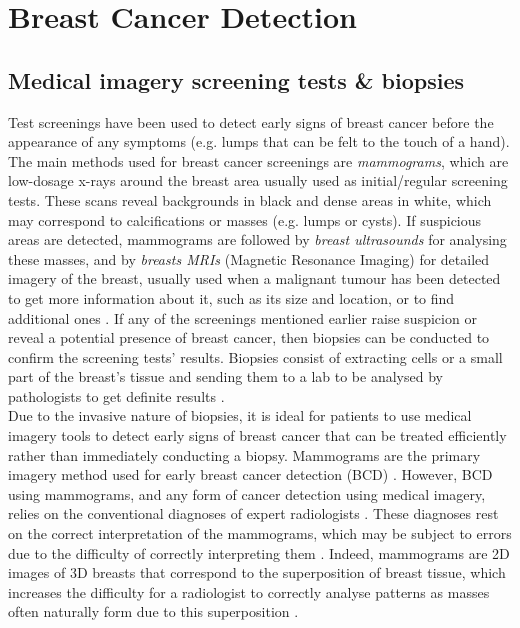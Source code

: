 
\section{Breast Cancer Detection}

\subsection{Medical imagery screening tests \& biopsies}
\label{sec:litreview-bcd-medical-imagery}

Test screenings have been used to detect early signs of breast cancer before the appearance of any symptoms (e.g. lumps that can be felt to the touch of a hand). The main methods used for breast cancer screenings are \textit{mammograms}, which are low-dosage x-rays around the breast area usually  used as initial/regular screening tests. These scans reveal backgrounds in black and dense areas in white, which may correspond to calcifications or masses (e.g. lumps or cysts). If suspicious areas are detected, mammograms are  followed by \textit{breast ultrasounds} for analysing these masses, and by \textit{breasts MRIs} (Magnetic Resonance Imaging) for detailed imagery of the breast, usually used when a malignant tumour has been detected to get more information about it, such as its size and location, or to find additional ones \citep{americanCancerSociety2019}. If any of the screenings mentioned earlier raise suspicion or reveal a potential presence of breast cancer, then biopsies can be conducted to confirm the screening tests' results. Biopsies consist of extracting cells or a small part of the breast's tissue and sending them to a lab to be analysed by pathologists to get definite results \citep{martin2019}.\\

Due to the invasive nature of biopsies, it is ideal for patients to use medical imagery tools to detect early signs of breast cancer that can be treated efficiently rather than immediately conducting a biopsy. Mammograms are the primary imagery method used for early breast cancer detection (BCD) \citep{Ramos-Pollan2012}. However, BCD using mammograms, and any form of cancer detection using medical imagery, relies on the conventional diagnoses of expert radiologists \citep{Osareh2010}. These diagnoses rest on the correct interpretation of the mammograms, which may be subject to errors due to the difficulty of correctly interpreting them \citep{Elter2009}. Indeed, mammograms are 2D images of 3D breasts that correspond to the superposition of breast tissue, which increases the difficulty for a radiologist to correctly analyse patterns as masses often naturally form due to this superposition \citep{Elter2009}.

